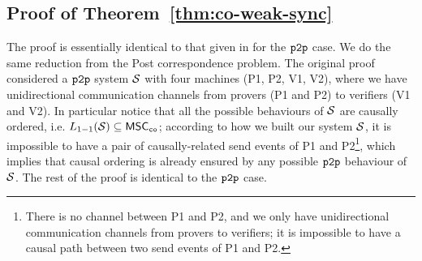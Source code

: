 \subsection{Proof of Theorem~\ref{thm:co-weak-sync}}
\label{apx:thm-co-weak-sync}
\thmCoWeakSync


The proof is essentially identical to that given in \cite{DBLP:conf/concur/BolligGFLLS21} for the $\mathtt{p2p}$ case. 
We do the same reduction from the Post correspondence problem. 
The original proof considered a $\mathtt{p2p}$ system $\mathcal{S}$ with four machines (P1, P2, V1, V2), where we have 
unidirectional communication channels from provers (P1 and P2) to verifiers (V1 and V2). In particular notice 
that all the possible behaviours of $\mathcal{S}$ are causally ordered, i.e. $L_{1\mathsf{-}1}(\mathcal{S}) \subseteq \mathsf{MSC}_{\mathtt{co}}$; 
according to how we built our system $\mathcal{S}$, it is impossible to have a pair of causally-related send 
events of P1 and P2\footnote{There is no channel between P1 and P2, and we only have unidirectional communication 
channels from provers to verifiers; it is impossible to have a causal path between two send events of P1 and P2.}, which implies that causal ordering is 
already ensured by any possible $\mathtt{p2p}$ behaviour of $\mathcal{S}$. The rest of the proof is identical to the 
$\mathtt{p2p}$ case.
